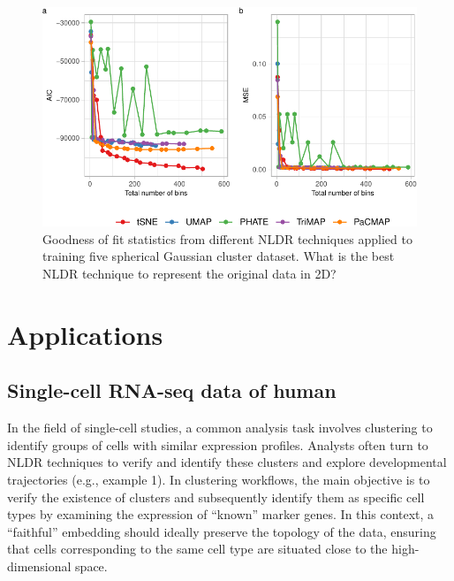 \documentclass[
  12pt]{article}
\begin{document}
\begin{figure}

{\centering \includegraphics[width=1\textwidth,height=\textheight]{paper_files/figure-pdf/fig-diagnosticpltGau-1.pdf}

}

\caption{\label{fig-diagnosticpltGau}Goodness of fit statistics from
different NLDR techniques applied to training five spherical Gaussian
cluster dataset. What is the best NLDR technique to represent the
original data in 2D?}

\end{figure}

\hypertarget{sec-applications}{%
\section{Applications}\label{sec-applications}}

\hypertarget{single-cell-rna-seq-data-of-human}{%
\subsection{Single-cell RNA-seq data of
human}\label{single-cell-rna-seq-data-of-human}}

In the field of single-cell studies, a common analysis task involves
clustering to identify groups of cells with similar expression profiles.
Analysts often turn to NLDR techniques to verify and identify these
clusters and explore developmental trajectories (e.g., example 1). In
clustering workflows, the main objective is to verify the existence of
clusters and subsequently identify them as specific cell types by
examining the expression of ``known'' marker genes. In this context, a
``faithful'' embedding should ideally preserve the topology of the data,
ensuring that cells corresponding to the same cell type are situated
close to the high-dimensional space.
\end{document}
